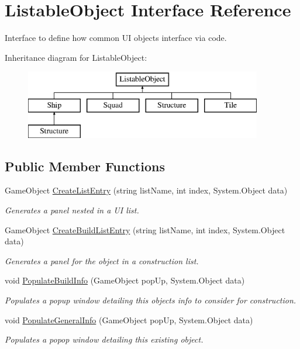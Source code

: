 \hypertarget{interface_listable_object}{}\section{Listable\+Object Interface Reference}
\label{interface_listable_object}


Interface to define how common U\+I objects interface via code.  


Inheritance diagram for Listable\+Object\+:\begin{figure}[H]
\begin{center}
\leavevmode
\includegraphics[height=3.000000cm]{interface_listable_object}
\end{center}
\end{figure}
\subsection*{Public Member Functions}
\begin{DoxyCompactItemize}
\item 
Game\+Object \hyperlink{interface_listable_object_a9d56c92f6bc509033acd8e4907341161}{Create\+List\+Entry} (string list\+Name, int index, System.\+Object data)
\begin{DoxyCompactList}\small\item\em Generates a panel nested in a U\+I list. \end{DoxyCompactList}\item 
Game\+Object \hyperlink{interface_listable_object_a9d802fbc18d07dd248350f0b09868f4d}{Create\+Build\+List\+Entry} (string list\+Name, int index, System.\+Object data)
\begin{DoxyCompactList}\small\item\em Generates a panel for the object in a construction list. \end{DoxyCompactList}\item 
void \hyperlink{interface_listable_object_a785c74f9662cc1430df5fd8cb1705901}{Populate\+Build\+Info} (Game\+Object pop\+Up, System.\+Object data)
\begin{DoxyCompactList}\small\item\em Populates a popup window detailing this object\textquotesingle{}s info to consider for construction. \end{DoxyCompactList}\item 
void \hyperlink{interface_listable_object_a54d6224a73481ceab1099cbcff8f484a}{Populate\+General\+Info} (Game\+Object pop\+Up, System.\+Object data)
\begin{DoxyCompactList}\small\item\em Populates a popop window detailing this existing object. \end{DoxyCompactList}\end{DoxyCompactItemize}


